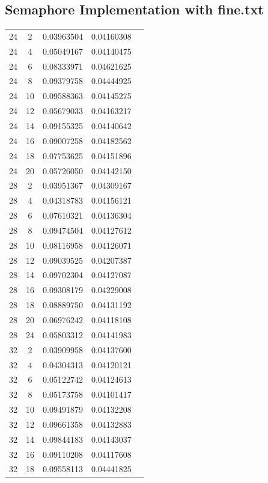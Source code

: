 \documentclass[letterpaper,12pt]{article}
\theoremstyle{remark}
\begin{document}
\subsection*{Semaphore Implementation  with fine.txt}
\begin{tabular}{ccccc}

24 & 2 & 0.03963504 & 0.04160308 \\
24 & 4 & 0.05049167 & 0.04140475 \\
24 & 6 & 0.08333971 & 0.04621625 \\
24 & 8 & 0.09379758 & 0.04444925 \\
24 & 10 & 0.09588363 & 0.04145275 \\
24 & 12 & 0.05679033 & 0.04163217 \\
24 & 14 & 0.09155325 & 0.04140642 \\
24 & 16 & 0.09007258 & 0.04182562 \\
24 & 18 & 0.07753625 & 0.04151896 \\
24 & 20 & 0.05726050 & 0.04142150 \\
28 & 2 & 0.03951367 & 0.04309167 \\
28 & 4 & 0.04318783 & 0.04156121 \\
28 & 6 & 0.07610321 & 0.04136304 \\
28 & 8 & 0.09474504 & 0.04127612 \\
28 & 10 & 0.08116958 & 0.04126071 \\
28 & 12 & 0.09039525 & 0.04207387 \\
28 & 14 & 0.09702304 & 0.04127087 \\
28 & 16 & 0.09308179 & 0.04229008 \\
28 & 18 & 0.08889750 & 0.04131192 \\
28 & 20 & 0.06976242 & 0.04118108 \\
28 & 24 & 0.05803312 & 0.04141983 \\
32 & 2 & 0.03909958 & 0.04137600 \\
32 & 4 & 0.04304313 & 0.04120121 \\
32 & 6 & 0.05122742 & 0.04124613 \\
32 & 8 & 0.05173758 & 0.04101417 \\
32 & 10 & 0.09491879 & 0.04132208 \\
32 & 12 & 0.09661358 & 0.04132883 \\
32 & 14 & 0.09844183 & 0.04143037 \\
32 & 16 & 0.09110208 & 0.04117608 \\
32 & 18 & 0.09558113 & 0.04441825 \\

\end{tabular}
\end{document}
